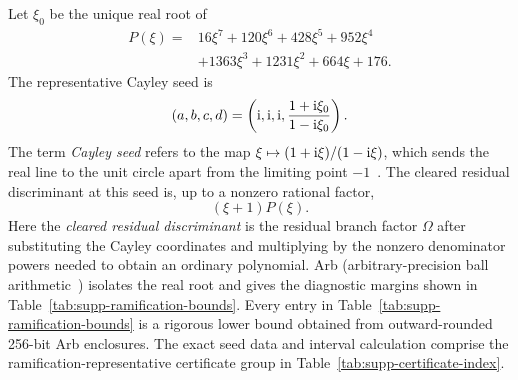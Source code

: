 {Let $\xi_0$ be the unique real root of}
\begin{equation}
\begin{aligned}
P(\xi)={}&16\xi^7+120\xi^6+428\xi^5+952\xi^4\\
&+1363\xi^3+1231\xi^2+664\xi+176.
\end{aligned}
\label{eq:supp-ramification-polynomial}
\end{equation}
{The representative Cayley seed is}
\begin{equation}
{(a,b,c,d)=\left(\mathrm i,\mathrm i,\mathrm i,\frac{1+\mathrm i\xi_0}{1-\mathrm i\xi_0}\right).}
\label{eq:supp-ramification-seed}
\end{equation}
{The term \emph{Cayley seed} refers to the map $\xi\mapsto(1+\mathrm i\xi)/(1-\mathrm i\xi)$, which sends the real line to the unit circle apart from the limiting point $-1$~\cite{Cayley1846}. The cleared residual discriminant at this seed is, up to a nonzero rational factor,}
\begin{equation}
(\xi+1)P(\xi).
\label{eq:supp-ramification-specialization}
\end{equation}
Here the \emph{cleared residual discriminant} is the residual branch factor $\Omega$ after substituting the Cayley coordinates and multiplying by the nonzero denominator powers needed to obtain an ordinary polynomial. Arb (arbitrary-precision ball arithmetic~\cite{Johansson2017Arb}) isolates the real root and gives the diagnostic margins shown in Table~\ref{tab:supp-ramification-bounds}.
{Every entry in Table~\ref{tab:supp-ramification-bounds} is a rigorous lower bound obtained from outward-rounded 256-bit Arb enclosures. The exact seed data and interval calculation comprise the ramification-representative certificate group in Table~\ref{tab:supp-certificate-index}.}


